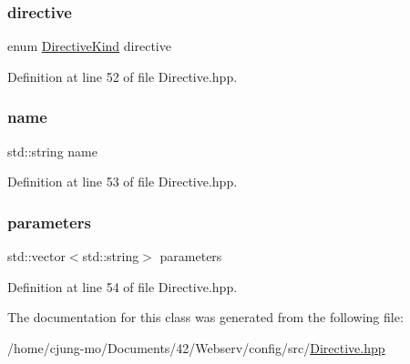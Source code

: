 \subsubsection{\texorpdfstring{directive}{directive}}
{\footnotesize\ttfamily enum \hyperlink{namespaceft_a5a5554dff10f0dc50bae4cc5825ad75d}{Directive\+Kind} directive}



Definition at line 52 of file Directive.\+hpp.

\mbox{\label{classft_1_1_directive_a9b45b3e13bd9167aab02e17e08916231}} 
\subsubsection{\texorpdfstring{name}{name}}
{\footnotesize\ttfamily std\+::string name}



Definition at line 53 of file Directive.\+hpp.

\mbox{\label{classft_1_1_directive_a2197fbfab6b0ae80e5599c8ddc562479}} 
\subsubsection{\texorpdfstring{parameters}{parameters}}
{\footnotesize\ttfamily std\+::vector$<$std\+::string$>$ parameters}



Definition at line 54 of file Directive.\+hpp.



The documentation for this class was generated from the following file\+:\begin{DoxyCompactItemize}
\item 
/home/cjung-\/mo/\+Documents/42/\+Webserv/config/src/\hyperlink{_directive_8hpp}{Directive.\+hpp}\end{DoxyCompactItemize}

